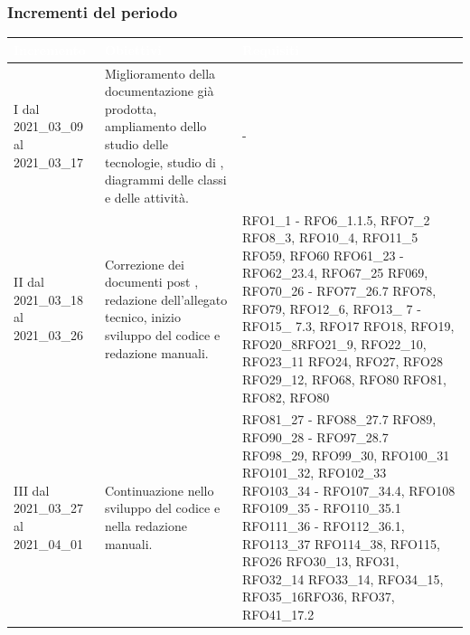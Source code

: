 \subsubsection{Incrementi del periodo}\label{IncrementiPDettaglio}
\begin{table}[H]
	\begin{center}
		\begin{tabular}{ |C{3cm} C{6cm} C{7cm}| }
			\textcolor{white}{\textbf{Incremento}} & \textcolor{white}{\textbf{Obiettivi}} & \textcolor{white}{\textbf{Requisiti}} \\ \hline
			I dal 2021\_03\_09 al 2021\_03\_17& Miglioramento della documentazione già prodotta, ampliamento dello studio delle tecnologie, studio di , diagrammi delle classi e delle attività.  & - \\ \hline
			II dal 2021\_03\_18 al 2021\_03\_26 	& Correzione dei documenti post , redazione dell'allegato tecnico, inizio sviluppo del codice e redazione manuali. &  
			RFO1\_1 - RFO6\_1.1.5, RFO7\_2 \newline
			RFO8\_3, RFO10\_4, RFO11\_5 \newline
			RFO59, RFO60 \newline
			RFO61\_23 - RFO62\_23.4, RFO67\_25 \newline
			RF069, RFO70\_26 - RFO77\_26.7 \newline
			RFO78, RFO79, RFO12\_6, \newline 
			RFO13\_ 7 - RFO15\_ 7.3, RFO17 \newline RFO18, RFO19, RFO20\_8\newline RFO21\_9, RFO22\_10, RFO23\_11 \newline RFO24, RFO27, RFO28 \newline RFO29\_12, RFO68, RFO80 \newline RFO81, RFO82, RFO80 \\ \hline
			III dal 2021\_03\_27 al 2021\_04\_01 	& Continuazione nello sviluppo del codice e nella redazione manuali. & RFO81\_27 - RFO88\_27.7 \newline
			RFO89, RFO90\_28 - RFO97\_28.7 \newline
			RFO98\_29, RFO99\_30, RFO100\_31 \newline
			RFO101\_32, RFO102\_33 \newline
			RFO103\_34 - RFO107\_34.4, RFO108 \newline
			RFO109\_35 - RFO110\_35.1\newline
			RFO111\_36 - RFO112\_36.1, RFO113\_37 \newline RFO114\_38, RFO115, RFO26 \newline RFO30\_13, RFO31, RFO32\_14 \newline RFO33\_14, RFO34\_15, RFO35\_16\newline  RFO36, RFO37, RFO41\_17.2 \\ \hline

\end{tabular}
\end{center}
\end{table}

